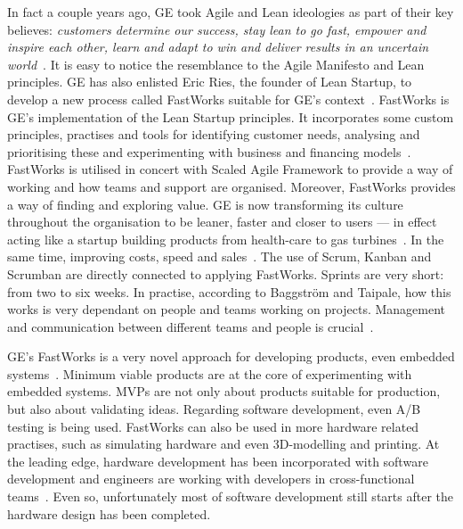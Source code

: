 \documentclass[english]{tktltiki2}
\begin{document}
In fact a couple years ago, GE took Agile and Lean ideologies as part of their key believes: \emph{customers determine our success, stay lean to go fast, empower and inspire each other, learn and adapt to win and deliver results in an uncertain world}~\cite{BT15}. It is easy to notice the resemblance to the Agile Manifesto and Lean principles. GE has also enlisted Eric Ries, the founder of Lean Startup, to develop a new process called FastWorks suitable for GE’s context~\cite{GE13, Clo14, Pow14, BT15}. FastWorks is GE’s implementation of the Lean Startup principles. It incorporates some custom principles, practises and tools for identifying customer needs, analysing and prioritising these and experimenting with business and financing models~\cite{BT15}. FastWorks is utilised in concert with Scaled Agile Framework to provide a way of working and how teams and support are organised. Moreover, FastWorks provides a way of finding and exploring value. GE is now transforming its culture throughout the organisation to be leaner, faster and closer to users — in effect acting like a startup building products from health-care to gas turbines~\cite{GE13, Clo14, Pow14}. In the same time, improving costs, speed and sales~\cite{Pow14}. The use of Scrum, Kanban and Scrumban are directly connected to applying FastWorks. Sprints are very short: from two to six weeks. In practise, according to Baggström and Taipale, how this works is very dependant on people and teams working on projects. Management and communication between different teams and people is crucial~\cite{BT15}.

GE’s FastWorks is a very novel approach for developing products, even embedded systems~\cite{BT15}. Minimum viable products are at the core of experimenting with embedded systems. MVPs are not only about products suitable for production, but also about validating ideas. Regarding software development, even A/B testing is being used. FastWorks can also be used in more hardware related practises, such as simulating hardware and even 3D-modelling and printing. At the leading edge, hardware development has been incorporated with software development and engineers are working with developers in cross-functional teams~\cite{BT15}. Even so, unfortunately most of software development still starts after the hardware design has been completed.
\end{document}
